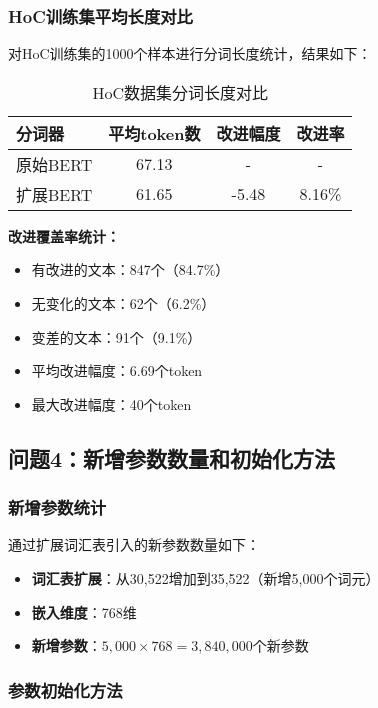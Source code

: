 \documentclass[12pt,letterpaper]{article}
\begin{document}
\subsubsection{HoC训练集平均长度对比}

对HoC训练集的1000个样本进行分词长度统计，结果如下：

\begin{table}[h]
\centering
\begin{tabular}{|l|c|c|c|}
\hline
\textbf{分词器} & \textbf{平均token数} & \textbf{改进幅度} & \textbf{改进率} \\
\hline
原始BERT & 67.13 & - & - \\
扩展BERT & 61.65 & -5.48 & 8.16\% \\
\hline
\end{tabular}
\caption{HoC数据集分词长度对比}
\end{table}

\textbf{改进覆盖率统计：}
\begin{itemize}
    \item 有改进的文本：847个（84.7\%）
    \item 无变化的文本：62个（6.2\%）
    \item 变差的文本：91个（9.1\%）
    \item 平均改进幅度：6.69个token
    \item 最大改进幅度：40个token
\end{itemize}

\subsection{问题4：新增参数数量和初始化方法}

\subsubsection{新增参数统计}

通过扩展词汇表引入的新参数数量如下：

\begin{itemize}
    \item \textbf{词汇表扩展}：从30,522增加到35,522（新增5,000个词元）
    \item \textbf{嵌入维度}：768维
    \item \textbf{新增参数}：$5,000 \times 768 = 3,840,000$个新参数
\end{itemize}

\subsubsection{参数初始化方法}
\end{document}
